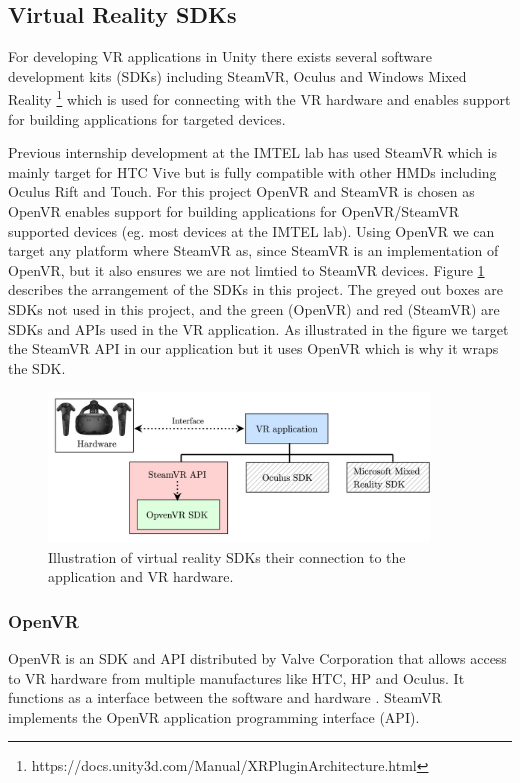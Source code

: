 \subsection{Virtual Reality SDKs}
For developing VR applications in Unity there exists several software development kits (SDKs) including SteamVR, Oculus and Windows Mixed Reality \footnote{https://docs.unity3d.com/Manual/XRPluginArchitecture.html} which is used for connecting with the VR hardware and enables support for building applications for targeted devices.  

Previous internship development at the IMTEL lab has used SteamVR which is mainly target for HTC Vive but is fully compatible with other HMDs including Oculus Rift and Touch. For this project OpenVR and SteamVR is chosen as OpenVR enables support for building applications for OpenVR/SteamVR supported devices (eg. most devices at the IMTEL lab). Using OpenVR we can target any platform where SteamVR as, since SteamVR is an implementation of OpenVR, but it also ensures we are not limtied to SteamVR devices.  Figure \ref{fig:vr_sdk} describes the arrangement of the SDKs in this project. The greyed out boxes are SDKs not used in this project, and the green (OpenVR) and red (SteamVR) are SDKs and APIs used in the VR application. As illustrated in the figure we target the SteamVR API in our application but it uses OpenVR which is why it wraps the SDK.

\begin{figure}[!ht]
    \centering
    \includegraphics[width=0.9\textwidth]{./fig/background/VR_sdk.png}
    \caption{Illustration of virtual reality SDKs their connection to the application and VR hardware. }
    \label{fig:vr_sdk}
\end{figure}

\subsubsection{OpenVR}
OpenVR is an SDK and API distributed by Valve Corporation that allows access to VR hardware from multiple manufactures like HTC, HP and Oculus. It functions as a interface between the software and hardware \cite{openVRsdk}. SteamVR implements the OpenVR application programming interface (API).  

